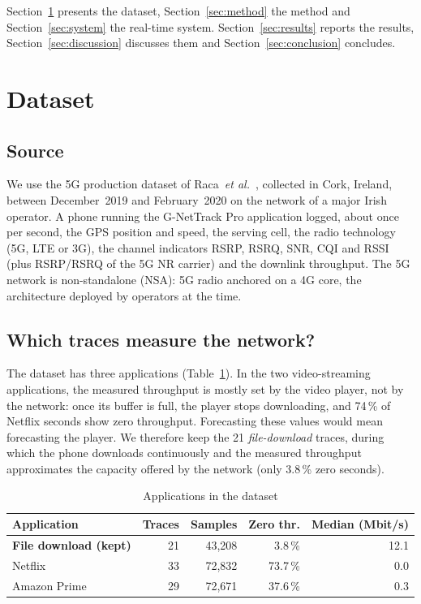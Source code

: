 \documentclass[10pt,a4paper,twocolumn]{article}
\begin{document}
Section~\ref{sec:data} presents the dataset, Section~\ref{sec:method} the method and
Section~\ref{sec:system} the real-time system. Section~\ref{sec:results} reports the
results, Section~\ref{sec:discussion} discusses them and Section~\ref{sec:conclusion}
concludes.

\section{Dataset}
\label{sec:data}

\subsection{Source}
We use the 5G production dataset of Raca~\textit{et al.}~\cite{raca2020}, collected in
Cork, Ireland, between December~2019 and February~2020 on the network of a major Irish
operator. A phone running the G-NetTrack Pro application logged, about once per second,
the GPS position and speed, the serving cell, the radio technology (5G, LTE or 3G), the
channel indicators RSRP, RSRQ, SNR, CQI and RSSI (plus RSRP/RSRQ of the 5G NR carrier) and
the downlink throughput. The 5G network is non-standalone (NSA): 5G radio anchored on a
4G core, the architecture deployed by operators at the time.

\subsection{Which traces measure the network?}
The dataset has three applications (Table~\ref{tab:apps}). In the two video-streaming
applications, the measured throughput is mostly set by the video player, not by the
network: once its buffer is full, the player stops downloading, and 74\,\% of Netflix
seconds show zero throughput. Forecasting these values would mean forecasting the player.
We therefore keep the 21 \emph{file-download} traces, during which the phone downloads
continuously and the measured throughput approximates the capacity offered by the
network (only 3.8\,\% zero seconds).

\begin{table}[t]
\caption{Applications in the dataset}
\label{tab:apps}
\centering\footnotesize
\begin{tabular}{@{}lrrrr@{}}
\toprule
Application & Traces & Samples & Zero thr. & Median (Mbit/s) \\
\midrule
\textbf{File download (kept)} & 21 & 43,208 & 3.8\,\% & 12.1 \\
Netflix & 33 & 72,832 & 73.7\,\% & 0.0 \\
Amazon Prime & 29 & 72,671 & 37.6\,\% & 0.3 \\
\bottomrule
\end{tabular}
\end{table}
\end{document}
